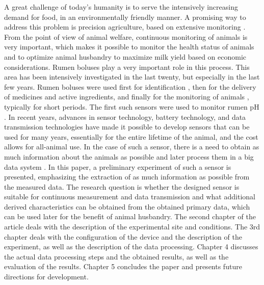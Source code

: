 \documentclass[conference]{IEEEtran}
\begin{document}
A great challenge of today’s humanity is to serve the intensively increasing
demand for food, in an environmentally friendly manner. A promising way to
address this problem is precision agriculture, based on extensive monitoring \cite{berckmans2014, hokofarm2019}.
From the point of view of animal welfare, continuous monitoring of animals is
very important, which makes it possible to monitor the health status of animals
and to optimize animal husbandry to maximize milk yield \cite{john2016, aidin2019} based on economic
considerations. Rumen boluses play a very important role in this process. This
area has been intensively investigated in the last twenty, but especially in
the last few years. Rumen boluses were used first for identification
\cite{RUIZGARCIA201142, hanton1974}, then for the delivery of medicines and active
ingredients, and finally for the monitoring of animals \cite{nagl2003}, typically for short
periods. The first such sensors were used to monitor rumen pH \cite{neubauer2018}. In recent years,
advances in sensor technology, battery technology, and data transmission
technologies have made it possible to develop sensors that can be used for many
years, essentially for the entire lifetime of the animal, and the cost allows
for all-animal use. In the case of such a sensor, there is a need to obtain as
much information about the animals as possible and later process them in a big
data system \cite{Cabrera2021}. In this paper, a preliminary experiment of such a sensor is
presented, emphasizing the extraction of as much information as possible from
the measured data. The research question is whether the designed sensor is
suitable for continuous measurement and data transmission and what additional
derived characteristics can be obtained from the obtained primary data, which
can be used later for the benefit of animal husbandry. The second chapter of
the article deals with the description of the experimental site and conditions.
The 3rd chapter deals with the configuration of the device and the description
of the experiment, as well as the description of the data processing.
Chapter 4 discusses the actual data processing steps and the obtained results,
as well as the evaluation of the results. Chapter 5 concludes the paper and
presents future directions for development.


\end{document}
